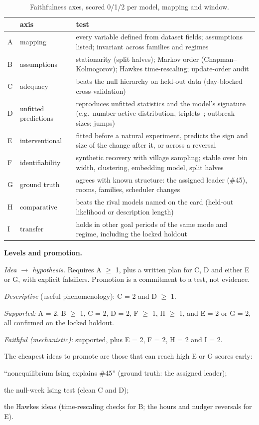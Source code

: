 \documentclass[reprint,aps,pre,10pt,superscriptaddress,nofootinbib]{revtex4-2}
\newenvironment{tight}{\begin{list}{\textbullet}{\setlength{\itemsep}{0pt}\setlength{\parsep}{0pt}\setlength{\topsep}{2pt}\setlength{\partopsep}{0pt}\setlength{\leftmargin}{1.1em}\setlength{\labelwidth}{0.6em}\setlength{\labelsep}{0.4em}}}{\end{list}}
\begin{document}
\begin{table}[t]
\caption{Faithfulness axes, scored 0/1/2 per model, mapping and window.}
\label{tab:faith}
\scriptsize
\begin{tabular}{@{}l@{\hspace{4pt}}p{2.05cm}p{4.95cm}@{}}
\toprule
 & axis & test \\ \midrule
A & mapping & every variable defined from dataset fields; assumptions listed; invariant across families and regimes \\
B & assumptions & stationarity (split halves); Markov order (Chapman--Kolmogorov); Hawkes time-rescaling; update-order audit \\
C & adequacy & beats the null hierarchy on held-out data (day-blocked cross-validation) \\
D & unfitted predictions & reproduces unfitted statistics and the model's signature (e.g.\ number-active distribution, triplets~\cite{schneidman2006}; outbreak sizes; jumps) \\
E & interventional & fitted before a natural experiment, predicts the sign and size of the change after it, or across a reversal \\
F & identifiability & synthetic recovery with village sampling; stable over bin width, clustering, embedding model, split halves \\
G & ground truth & agrees with known structure: the assigned leader (\#45), rooms, families, scheduler changes \\
H & comparative & beats the rival models named on the card (held-out likelihood or description length) \\
I & transfer & holds in other goal periods of the same mode and regime, including the locked holdout \\
\bottomrule
\end{tabular}
\end{table}

\textbf{Levels and promotion.}
\begin{tight}
\item \emph{Idea $\to$ hypothesis.} Requires A $\geq$ 1, plus a written plan for C, D and either E or G, with explicit falsifiers. Promotion is a commitment to a test, not evidence.
\item \emph{Descriptive} (useful phenomenology): C = 2 and D $\geq$ 1.
\item \emph{Supported:} A = 2, B $\geq$ 1, C = 2, D = 2, F $\geq$ 1, H $\geq$ 1, and E = 2 or G = 2, all confirmed on the locked holdout.
\item \emph{Faithful (mechanistic):} supported, plus E = 2, F = 2, H = 2 and I = 2.
\end{tight}
The cheapest ideas to promote are those that can reach high E or G scores early:
\begin{tight}
\item ``nonequilibrium Ising explains \#45'' (ground truth: the assigned leader);
\item the null-week Ising test (clean C and D);
\item the Hawkes ideas (time-rescaling checks for B; the hours and nudger reversals for E).
\end{tight}
\end{document}
